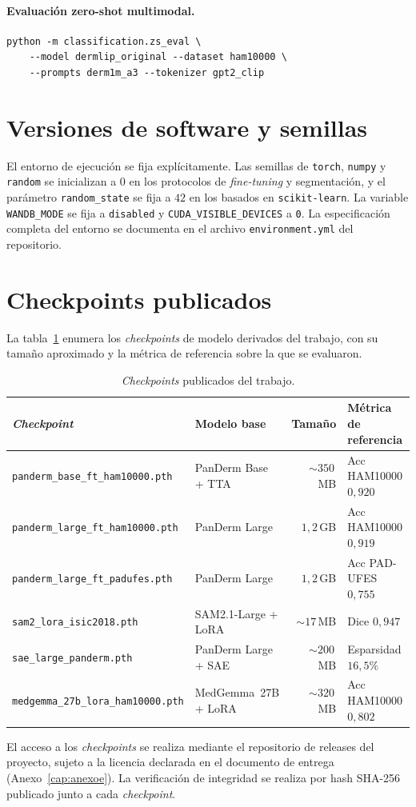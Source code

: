 \paragraph{Evaluación zero-shot multimodal.}
\begin{verbatim}
python -m classification.zs_eval \
    --model dermlip_original --dataset ham10000 \
    --prompts derm1m_a3 --tokenizer gpt2_clip
\end{verbatim}

\section{Versiones de software y semillas}
\label{sec:anexoa-versiones}

El entorno de ejecución se fija explícitamente. Las semillas de
\texttt{torch}, \texttt{numpy} y \texttt{random} se inicializan a
$0$ en los protocolos de \emph{fine-tuning} y segmentación, y
el parámetro \texttt{random\_state} se fija a $42$ en los
basados en \texttt{scikit-learn}. La variable
\texttt{WANDB\_MODE} se fija a \texttt{disabled} y
\texttt{CUDA\_VISIBLE\_DEVICES} a \texttt{0}. La especificación
completa del entorno se documenta en el archivo \texttt{environment.yml}
del repositorio.

\section{Checkpoints publicados}
\label{sec:anexoa-checkpoints}

La tabla~\ref{tab:anexoa-checkpoints} enumera los
\emph{checkpoints} de modelo derivados del trabajo, con su tamaño
aproximado y la métrica de referencia sobre la que se evaluaron.

\begin{table}[H]
\centering
\footnotesize
\setlength{\tabcolsep}{4pt}
\renewcommand{\arraystretch}{0.95}
\caption{\emph{Checkpoints} publicados del trabajo.}
\label{tab:anexoa-checkpoints}
\begin{tabular}{llrl}
\hline
\emph{Checkpoint}                          & Modelo base       & Tamaño & Métrica de referencia \\
\hline
\texttt{panderm\_base\_ft\_ham10000.pth}   & PanDerm Base + TTA & $\sim 350$\,MB & Acc HAM10000 $0{,}920$ \\
\texttt{panderm\_large\_ft\_ham10000.pth}  & PanDerm Large     & $1{,}2$\,GB & Acc HAM10000 $0{,}919$ \\
\texttt{panderm\_large\_ft\_padufes.pth}   & PanDerm Large     & $1{,}2$\,GB & Acc PAD-UFES $0{,}755$ \\
\texttt{sam2\_lora\_isic2018.pth}          & SAM2.1-Large + LoRA & $\sim 17$\,MB & Dice $0{,}947$ \\
\texttt{sae\_large\_panderm.pth}           & PanDerm Large + SAE & $\sim 200$\,MB & Esparsidad $16{,}5\%$ \\
\texttt{medgemma\_27b\_lora\_ham10000.pth} & MedGemma~27B + LoRA & $\sim 320$\,MB & Acc HAM10000 $0{,}802$ \\
\hline
\end{tabular}
\end{table}

El acceso a los \emph{checkpoints} se realiza mediante el
repositorio de releases del proyecto, sujeto a la licencia
declarada en el documento de entrega
(Anexo~\ref{cap:anexoe}). La verificación de integridad se
realiza por hash SHA-256 publicado junto a cada \emph{checkpoint}.

